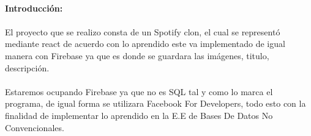 \documentclass[40pt]{article}
\begin{document}
\newpage

\maketitle
\textsf{\ \\
\textbf{Introducción:}\\
\\
El proyecto que se realizo consta de un Spotify clon, el cual se representó mediante react de acuerdo con lo aprendido este va implementado de igual manera con Firebase ya que es donde se guardara las imágenes, titulo, descripción.
\\
\\
Estaremos ocupando Firebase ya que no es SQL tal y como lo marca el programa, de igual forma se utilizara Facebook For Developers, todo esto con la finalidad de implementar lo aprendido en la E.E de Bases De Datos No Convencionales.
\\}
\end{document}
